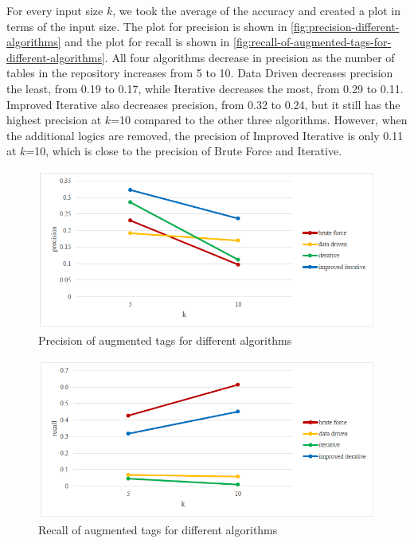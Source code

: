 For every input size $k$, we took the average of the accuracy and created a plot in terms of the input size. The plot for precision is shown in \autoref{fig:precision-different-algorithms} and the plot for recall is shown in \autoref{fig:recall-of-augmented-tags-for-different-algorithms}. All four algorithms decrease in precision as the number of tables in the repository increases from 5 to 10. Data Driven decreases precision the least, from 0.19 to 0.17, while Iterative decreases the most, from 0.29 to 0.11. Improved Iterative also decreases precision, from 0.32 to 0.24, but it still has the highest precision at $k$=10 compared to the other three algorithms. However, when the additional logics are removed, the precision of Improved Iterative is only 0.11 at $k$=10, which is close to the precision of Brute Force and Iterative.

\begin{figure}
  \centering
  \includegraphics[width=5in]{figures/precision-different-algorithms.png}
  \caption{Precision of augmented tags for different algorithms}
  \label{fig:precision-different-algorithms}
\end{figure}

\begin{figure}
  \centering
  \includegraphics[width=5in]{figures/recall-of-augmented-tags-for-different-algorithms.png}
  \caption{Recall of augmented tags for different algorithms}
  \label{fig:recall-of-augmented-tags-for-different-algorithms}
\end{figure}

